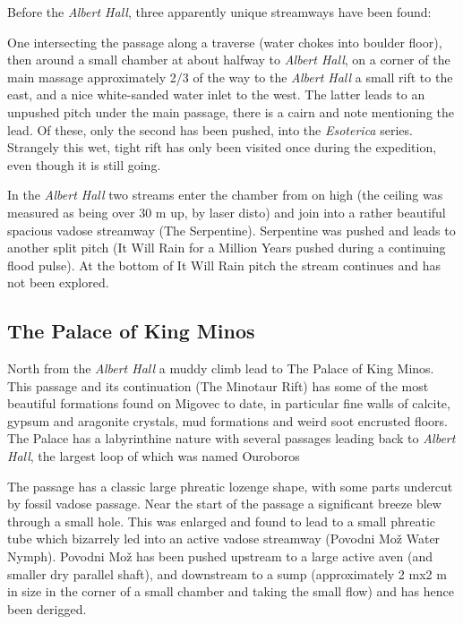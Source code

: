 Before the \emph{Albert Hall}, three apparently unique streamways have
been found:

One intersecting the passage along a traverse (water chokes into boulder
floor), then around a small chamber at about halfway to \emph{Albert
Hall}, on a corner of the main massage approximately 2/3 of the way to
the \emph{Albert Hall} a small rift to the east, and a nice white-sanded
water inlet to the west. The latter leads to an unpushed pitch under the
main passage, there is a cairn and note mentioning the lead. Of these,
only the second has been pushed, into the \emph{Esoterica} series.
Strangely this wet, tight rift has only been visited once during the
expedition, even though it is still going.

In the \emph{Albert Hall} two streams enter the chamber from on high
(the ceiling was measured as being over 30 m up, by laser disto) and
join into a rather beautiful spacious vadose streamway (The Serpentine).
Serpentine was pushed and leads to another split pitch (It Will Rain for
a Million Years \textemdash{} pushed during a continuing flood pulse).
At the bottom of It Will Rain pitch the stream continues and has not
been explored.


\subsection{The Palace of King Minos}

North from the \emph{Albert Hall} a muddy climb lead to The Palace of
King Minos. This passage and its continuation (The Minotaur Rift) has
some of the most beautiful formations found on Migovec to date, in
particular fine walls of calcite, gypsum and aragonite crystals, mud
formations and weird soot encrusted floors. The Palace has a
labyrinthine nature with several passages leading back to \emph{Albert
Hall}, the largest loop of which was named Ouroboros

The passage has a classic large phreatic lozenge shape, with some parts
undercut by fossil vadose passage. Near the start of the passage a
significant breeze blew through a small hole. This was enlarged and
found to lead to a small phreatic tube which bizarrely led into an
active vadose streamway (Povodni Mo\v{z} \textemdash{} Water Nymph).
Povodni Mo\v{z} has been pushed upstream to a large active aven (and
smaller dry parallel shaft), and downstream to a sump (approximately 2
mx2 m in size in the corner of a small chamber and taking the small
flow) and has hence been derigged.

